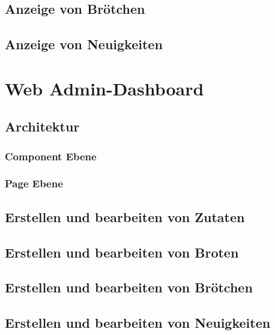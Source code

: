 \subsection{Anzeige von Brötchen}

\subsection{Anzeige von Neuigkeiten}

\clearpage

\section{Web Admin-Dashboard}

\subsection{Architektur}

\subsubsection{Component Ebene}

\subsubsection{Page Ebene}

\clearpage

\subsection{Erstellen und bearbeiten von Zutaten}

\subsection{Erstellen und bearbeiten von Broten}

\subsection{Erstellen und bearbeiten von Brötchen}

\subsection{Erstellen und bearbeiten von Neuigkeiten}